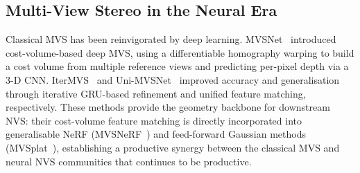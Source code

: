 \subsection{Multi-View Stereo in the Neural Era}

Classical MVS has been reinvigorated by deep learning.
MVSNet~\citep{yao2018mvsnet} introduced cost-volume-based deep MVS, using a
differentiable homography warping to build a cost volume from multiple reference
views and predicting per-pixel depth via a 3-D CNN.
IterMVS~\citep{wang2022itermvs} and Uni-MVSNet~\citep{peng2022unimvsnet}
improved accuracy and generalisation through iterative GRU-based refinement and
unified feature matching, respectively.
These methods provide the geometry backbone for downstream NVS: their
cost-volume feature matching is directly incorporated into generalisable NeRF
(MVSNeRF~\citep{chen2021mvsnerf}) and feed-forward Gaussian methods
(MVSplat~\citep{chen2024mvsplat}), establishing a productive synergy between
the classical MVS and neural NVS communities that continues to be productive.

